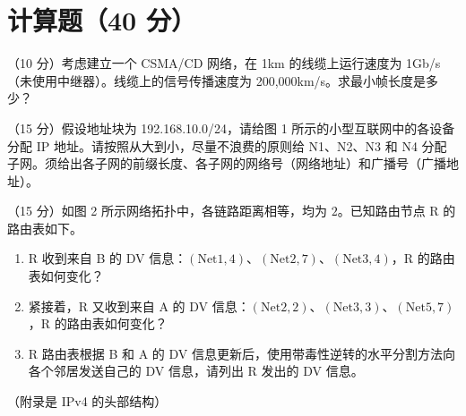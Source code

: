 \section{计算题（40 分）}
\begin{question}[index=1]
（10 分）考虑建立一个 CSMA/CD 网络，在 1km 的线缆上运行速度为 1Gb/s（未使用中继器）。线缆上的信号传播速度为 200,000km/s。求最小帧长度是多少？
\end{question}
\begin{question}[index=2]
（15 分）假设地址块为 192.168.10.0/24，请给图 1 所示的小型互联网中的各设备分配 IP 地址。请按照从大到小，尽量不浪费的原则给 N1、N2、N3 和 N4 分配子网。须给出各子网的前缀长度、各子网的网络号（网络地址）和广播号（广播地址）。
\par\noindent\makebox[\linewidth][c]{\resizebox{.96\linewidth}{!}{}}
\par\noindent{}
\end{question}
\begin{question}[index=3]
（15 分）如图 2 所示网络拓扑中，各链路距离相等，均为 $2$。已知路由节点 R 的路由表如下。
\par\smallskip\noindent{}
\begin{enumerate}
\item[\tikzcirclednumber{1}] R 收到来自 B 的 DV 信息：$(\mathrm{Net1},4)$、$(\mathrm{Net2},7)$、$(\mathrm{Net3},4)$，R 的路由表如何变化？
\item[\tikzcirclednumber{2}] 紧接着，R 又收到来自 A 的 DV 信息：$(\mathrm{Net2},2)$、$(\mathrm{Net3},3)$、$(\mathrm{Net5},7)$，R 的路由表如何变化？
\item[\tikzcirclednumber{3}] R 路由表根据 B 和 A 的 DV 信息更新后，使用带毒性逆转的水平分割方法向各个邻居发送自己的 DV 信息，请列出 R 发出的 DV 信息。
\end{enumerate}
\end{question}
\noindent（附录是 IPv4 的头部结构）

